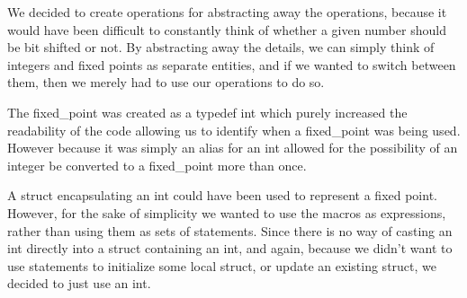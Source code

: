 We decided to create operations for abstracting away the operations, because it
would have been difficult to constantly think of whether a given number should
be bit shifted or not. By abstracting away the details, we can simply think of
integers and fixed points as separate entities, and if we wanted to switch
between them, then we merely had to use our operations to do so.

The fixed\_point was created as a typedef int which purely increased the
readability of the code allowing us to identify when a fixed\_point was being
used. However because it was simply an alias for an int allowed for the
possibility of an integer be converted to a fixed\_point more than once.

A struct encapsulating an int could have been used to represent a fixed
point. However, for the sake of simplicity we wanted to use the macros as
expressions, rather than using them as sets of statements. Since there is no way
of casting an int directly into a struct containing an int, and again, because
we didn't want to use statements to initialize some local struct, or update an
existing struct, we decided to just use an int.
